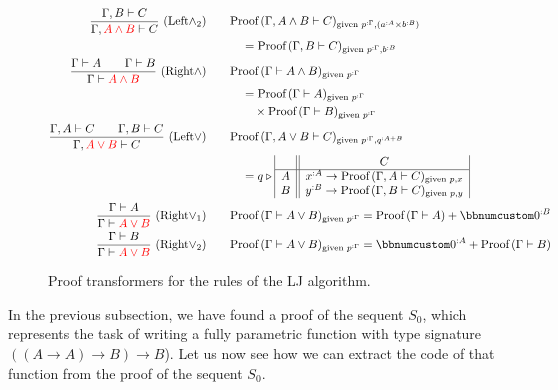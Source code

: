 \begin{figure}
\begin{centering}
{\begin{minipage}[t]{1\columnwidth - 2\fboxsep - 2\fboxrule}
{\begin{align*}
\frac{\Gamma,B\vdash C}{\Gamma,{\color{red}A\wedge B}\vdash C}~(\text{Left}\wedge_{2})\quad & \quad\text{Proof}\,(\Gamma,A\wedge B\vdash C)_{\text{given }p^{:\Gamma},(a^{:A}\times b^{:B})}\\
 & \quad\quad=\text{Proof}\,(\Gamma,B\vdash C)_{\text{given }p^{:\Gamma},b^{:B}}\\
\frac{\Gamma\vdash A\quad\quad\Gamma\vdash B}{\Gamma\vdash{\color{red}A\wedge B}}~(\text{Right}\wedge)\quad & \quad\text{Proof}\,(\Gamma\vdash A\wedge B)_{\text{given }p^{:\Gamma}}\\
 & \quad\quad=\text{Proof}\,(\Gamma\vdash A)_{\text{given }p^{:\Gamma}}\\
 & \quad\quad\quad\times\text{Proof}\,(\Gamma\vdash B)_{\text{given }p^{:\Gamma}}\\
\frac{\Gamma,A\vdash C\quad\quad\Gamma,B\vdash C}{\Gamma,{\color{red}A\vee B}\vdash C}~(\text{Left}\vee)\quad & \quad\text{Proof}\,(\Gamma,A\vee B\vdash C)_{\text{given }p^{:\Gamma},q^{:A+B}}\\
 & \quad\quad=q\triangleright\begin{array}{|c||c|}
 & C\\
\hline A & x^{:A}\rightarrow\text{Proof}\,(\Gamma,A\vdash C)_{\text{given }p,x}\\
B & y^{:B}\rightarrow\text{Proof}\,(\Gamma,B\vdash C)_{\text{given }p,y}
\end{array}\\
\frac{\Gamma\vdash A}{\Gamma\vdash{\color{red}A\vee B}}~(\text{Right}\vee_{1})\quad & \quad\text{Proof}\,(\Gamma\vdash A\vee B)_{\text{given }p^{:\Gamma}}=\text{Proof}\,(\Gamma\vdash A)+\bbnum 0^{:B}\\
\frac{\Gamma\vdash B}{\Gamma\vdash{\color{red}A\vee B}}~(\text{Right}\vee_{2})\quad & \quad\text{Proof}\,(\Gamma\vdash A\vee B)_{\text{given }p^{:\Gamma}}=\bbnum 0^{:A}+\text{Proof}\,(\Gamma\vdash B)
\end{align*}
\medskip{}
}%
\end{minipage}}{\small\par}
\par\end{centering}
\caption{\label{fig:proof-transformers-for-LJ-rules}Proof transformers for
the rules of the LJ algorithm.}
\end{figure}

In the previous subsection, we have found a proof of the sequent $S_{0}$,
which represents the task of writing a fully parametric function with
type signature $(\left(A\rightarrow A\right)\rightarrow B)\rightarrow B$).
Let us now see how we can extract the code of that function from the
proof of the sequent $S_{0}$.

